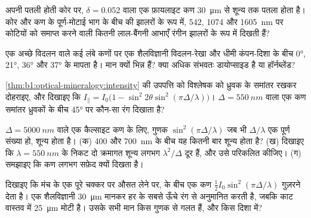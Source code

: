 \begin{exercise}[$\star\star$]\label{exo:b1:optical-mineralogy:8}
अपनी पतली होती कोर पर, $\delta = 0.052$ वाला एक फ़ायलाइट कण \qty{30}{\micro m} से शून्य तक पतला होता है। कोर और कण के पूर्ण-मोटाई
भाग के बीच की झालरों के रूप में, 542, 1074 और \qty{1605}{nm} पर कोटियों को समाप्त करने वाली कितनी लाल-बैंगनी आभाएँ
रंगीन झालरों के रूप में दिखती हैं?
\end{exercise}

\begin{exercise}[$\star\star$]\label{exo:b1:optical-mineralogy:9}
एक अच्छे विदलन वाले कई लंबे कणों पर एक शैलविज्ञानी विदलन-रेखा और धीमी कंपन-दिशा के बीच \ang{0}, \ang{21}, \ang{36} और
\ang{37} के  मापता है। मान क्यों भिन्न हैं? क्या  अधिक संभवतः डायोप्साइड है या हॉर्नब्लेंड?
\end{exercise}

\begin{exercise}[$\star\star\star$]\label{exo:b1:optical-mineralogy:10}
\cref{thm:b1:optical-mineralogy:intensity} की उपपत्ति को विश्लेषक को ध्रुवक के समांतर रखकर दोहराइए, और दिखाइए कि
$I_\parallel = I_0\bigl(1 - \sin^2 2\theta\sin^2(\pi\Delta/\lambda)\bigr)$। $\Delta = \qty{550}{nm}$ वाला एक कण समांतर ध्रुवकों
के बीच \ang{45} पर कौन-सा रंग दिखाता है?
\end{exercise}

\begin{exercise}[$\star\star\star$]\label{exo:b1:optical-mineralogy:11}
$\Delta = \qty{5000}{nm}$ वाले एक कैल्साइट कण के लिए, गुणक $\sin^2(\pi\Delta/\lambda)$ जब भी $\Delta/\lambda$ एक पूर्ण
संख्या हो, शून्य होता है। (क) \num{400} और \qty{700}{nm} के बीच यह कितनी बार शून्य होता है? (ख) दिखाइए कि
$\lambda = \qty{550}{nm}$ के निकट दो क्रमागत शून्य लगभग $\lambda^2/\Delta$ दूर हैं, और उसे परिकलित कीजिए। (ग) समझाइए कि
कण लगभग सफ़ेद क्यों दिखता है।
\end{exercise}

\begin{exercise}[$\star\star\star$]\label{exo:b1:optical-mineralogy:12}
दिखाइए कि मंच के एक पूरे चक्कर पर औसत लेने पर,  के बीच एक कण $\frac12 I_0\sin^2(\pi\Delta/\lambda)$ गुज़रने देता है।
एक शैलविज्ञानी \qty{30}{\micro m} मानकर हर  के सबसे ऊँचे रंग से  अनुमानित करती है, जबकि काट वास्तव में
\qty{25}{\micro m} मोटी है। उसके सभी मान किस गुणक से गलत हैं, और किस दिशा में?
\end{exercise}

